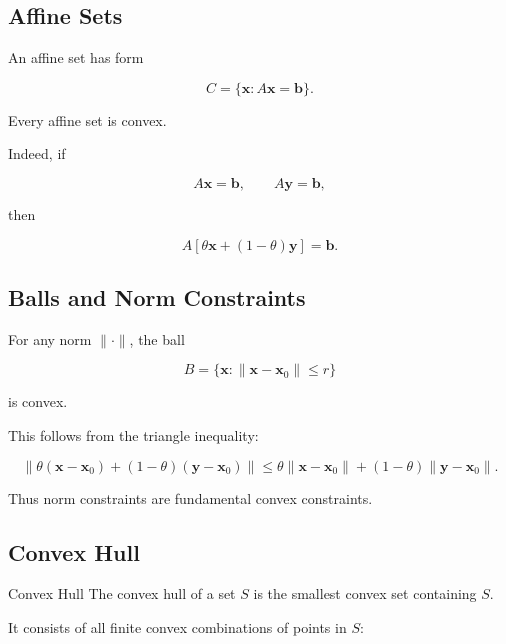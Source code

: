 \subsection{Affine Sets}
\label{subsec:affine-sets-convex}

An affine set has form

\[
\boxed{
C
=
\{
\mathbf{x}:
A\mathbf{x}=\mathbf{b}
\}.
}
\]

Every affine set is convex.

Indeed, if

\[
A\mathbf{x}=\mathbf{b},
\qquad
A\mathbf{y}=\mathbf{b},
\]

then

\[
A
[
\theta\mathbf{x}
+
(1-\theta)\mathbf{y}
]
=
\mathbf{b}.
\]

\subsection{Balls and Norm Constraints}
\label{subsec:balls-convex}

For any norm \(\|\cdot\|\), the ball

\[
\boxed{
B
=
\{
\mathbf{x}:
\|\mathbf{x}-\mathbf{x}_0\|\leq r
\}
}
\]

is convex.

This follows from the triangle inequality:

\[
\|
\theta(\mathbf{x}-\mathbf{x}_0)
+
(1-\theta)(\mathbf{y}-\mathbf{x}_0)
\|
\leq
\theta
\|\mathbf{x}-\mathbf{x}_0\|
+
(1-\theta)
\|\mathbf{y}-\mathbf{x}_0\|.
\]

Thus norm constraints are fundamental convex constraints.

\subsection{Convex Hull}
\label{subsec:convex-hull}

\begin{definitionbox}{Convex Hull}
The convex hull of a set \(S\) is the smallest convex set containing
\(S\).
\end{definitionbox}

It consists of all finite convex combinations of points in \(S\):

